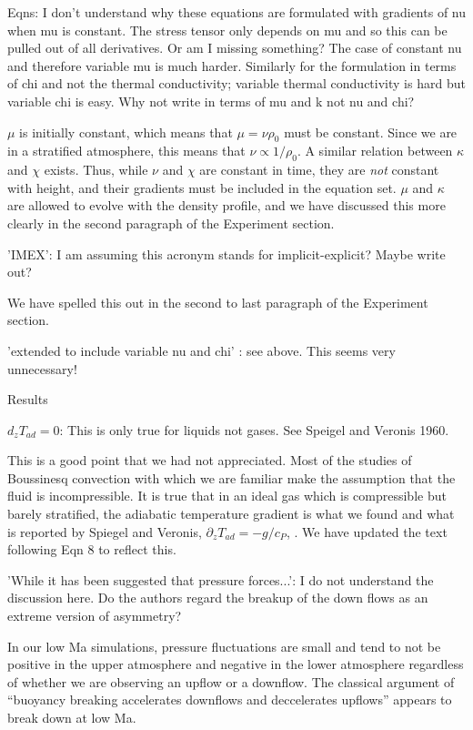 \documentclass[aps, 11pt, singlecolumn]{revtex4-1} %
\begin{document}
\begin{singlespace}
\begin{myquotation}
Eqns: I don't understand why these equations are formulated with
gradients of nu when mu is constant. The stress tensor only depends on
mu and so this can be pulled out of all derivatives. Or am I missing
something? The case of constant nu and therefore variable mu is much
harder. Similarly for the formulation in terms of chi and not the
thermal conductivity; variable thermal conductivity is hard but
variable chi is easy. Why not write in terms of mu and k not nu and
chi?
\end{myquotation}
$\mu$ is initially constant, which means that $\mu = \nu\rho_0$
must be constant.  Since we are in a stratified atmosphere, this
means that $\nu \propto 1/\rho_0$.  A similar relation between
$\kappa$ and $\chi$ exists.  Thus, while $\nu$ and $\chi$ are constant
in time, they are \emph{not} constant with height, and their
gradients must be included in the equation set.
$\mu$ and $\kappa$ are allowed to evolve with the
density profile, and we have discussed this more clearly in the
second paragraph of the Experiment section.

\begin{myquotation}
'IMEX': I am assuming this acronym stands for implicit-explicit?
Maybe write out?
\end{myquotation}
We have spelled this out in the second to last paragraph of the Experiment section.

\begin{myquotation}
'extended to include variable nu and chi' : see above. This seems
very unnecessary!

Results

$d_z T_{ad} = 0$: This is only true for liquids not gases. See Speigel and
Veronis 1960.
\end{myquotation}
This is a good point that we had not appreciated.  Most of the studies of Boussinesq
convection with which we are familiar make the assumption that the fluid is incompressible.
It is true that in an ideal gas which is compressible but barely stratified, the
adiabatic temperature gradient is what we found and what is reported by
Spiegel and Veronis, $\partial_z T_{ad} = -g/c_P$, \cite{spiegel&veronis1960}.
We have updated the text following Eqn 8 to reflect this.

\begin{myquotation}
'While it has been suggested that pressure forces...': I do not
understand the discussion here. Do the authors regard the breakup of
the down flows as an extreme version of asymmetry?
\end{myquotation}
In our low Ma simulations, pressure fluctuations are small and
tend to not be positive in the upper atmosphere and negative in the lower atmosphere
regardless of whether we are observing an upflow or a downflow.  The classical argument
\cite{hurlburt&all1984} of ``buoyancy breaking accelerates downflows and deccelerates
upflows'' appears to break down at low Ma.


\end{singlespace}
\end{document}
